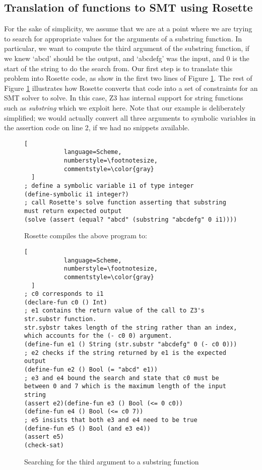\subsection{Translation of functions to SMT using Rosette}
For the sake of simplicity, we assume that we are at a point where we are trying to search for appropriate values for the arguments of a substring function.  In particular, we want to compute the third argument of the substring function, if we knew `abcd' should be the output, and `abcdefg' was the input, and 0 is the start of the string to do the search from.  Our first step is to translate this problem into Rosette \cite{Rosette} code, as show in the first two lines of Figure \ref{fig:2}.  The rest of Figure \ref{fig:2} illustrates how Rosette converts that code into a set of constraints for an SMT solver to solve.  In this case, Z3 has internal support for string functions such as \emph{substring} which we exploit here.  Note that our example is deliberately simplified; we would actually convert all three arguments to symbolic variables in the assertion code on line 2, if we had no snippets available.   

\begin{figure}
\caption{Searching for the third argument to a substring function}
\label{fig:2}
\begin{lstlisting}[
           language=Scheme,
           numberstyle=\footnotesize,
           commentstyle=\color{gray}
  ]
; define a symbolic variable i1 of type integer
(define-symbolic i1 integer?)
; call Rosette's solve function asserting that substring must return expected output
(solve (assert (equal? "abcd" (substring "abcdefg" 0 i1))))
\end{lstlisting}

Rosette compiles the above program to:

\begin{lstlisting}[
           language=Scheme,
           numberstyle=\footnotesize,
           commentstyle=\color{gray}
  ]
; c0 corresponds to i1
(declare-fun c0 () Int)
; e1 contains the return value of the call to Z3's str.substr function.  
str.sybstr takes length of the string rather than an index, 
which accounts for the (- c0 0) argument.
(define-fun e1 () String (str.substr "abcdefg" 0 (- c0 0)))
; e2 checks if the string returned by e1 is the expected output
(define-fun e2 () Bool (= "abcd" e1))
; e3 and e4 bound the search and state that c0 must be between 0 and 7 which is the maximum length of the input string
(assert e2)(define-fun e3 () Bool (<= 0 c0))
(define-fun e4 () Bool (<= c0 7))
; e5 insists that both e3 and e4 need to be true
(define-fun e5 () Bool (and e3 e4))
(assert e5)
(check-sat)

\end{lstlisting}
\end{figure}

